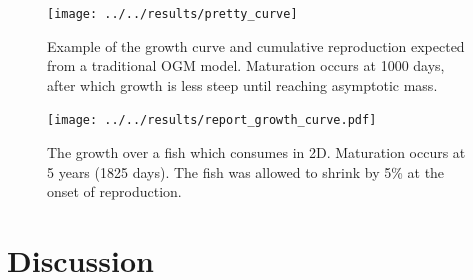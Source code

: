 \documentclass[a4paper, 11pt, hidelinks]{article} %
\begin{document}
%		
%		
%		
%		
%		
		
	\begin{figure}
		\centering %
		\texttt{[image: ../../results/pretty\_curve]}
		\caption{Example of the growth curve and cumulative reproduction expected from a traditional OGM model. Maturation occurs at 1000 days, after which growth is less steep until reaching asymptotic mass.  }
		\label{OGM_Curve}
	\end{figure}
	
	\begin{figure}
		
		\texttt{[image: ../../results/report\_growth\_curve.pdf]}
		\caption{The growth over a fish which consumes in 2D.  Maturation occurs at 5 years (1825 days).  The fish was allowed to shrink by 5\% at the onset of reproduction.}
		\label{growth_curve}
	\end{figure}



	\nolinenumbers
	
\section{Discussion}
	\linenumbers
	
	
	
\end{document}
